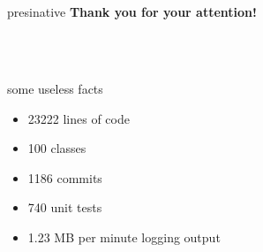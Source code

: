 \documentclass[hyperref={pdfpagelabels=false},compress]{beamer}
\begin{document}
\section{}
\begin{frame}
	\hfill
	\begin{beamercolorbox}[shadow=true, rounded=true, wd=10cm]{presinative}
		\centering
		\Large{\textbf{Thank you for your attention!}}
	\end{beamercolorbox}
	\hfill \\
	\hfill \\
	\begin{block}{some useless facts}
		\begin{itemize}
			\item 23222 lines of code
			\item 100 classes
			\item 1186 commits
			\item 740 unit tests
			\item 1.23 MB per minute logging output
		\end{itemize}
	\end{block}
\end{frame}
\end{document}
